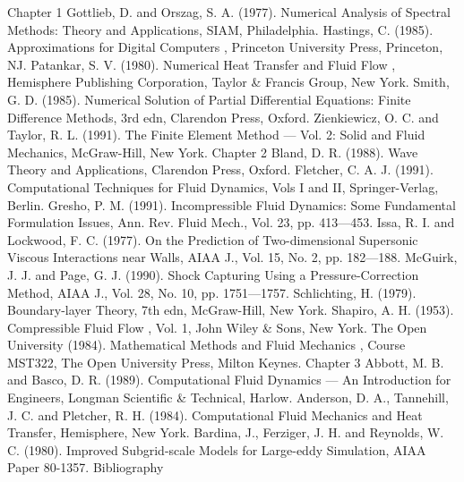 \documentclass[11pt,a4paper,openany,fontset=none]{ctexbook}
\begin{document}
\begin{sloppypar}

{\small Chapter 1 Gottlieb, D. and Orszag, S. A. (1977). Numerical Analysis of Spectral Methods: Theory and Applications, SIAM, Philadelphia. Hastings, C. (1985). Approximations for Digital Computers , Princeton University Press, Princeton, NJ. Patankar, S. V. (1980). Numerical Heat Transfer and Fluid Flow , Hemisphere Publishing Corporation, Taylor \& Francis Group, New York. Smith, G. D. (1985). Numerical Solution of Partial Differential Equations: Finite Difference Methods, 3rd edn, Clarendon Press, Oxford. Zienkiewicz, O. C. and Taylor, R. L. (1991). The Finite Element Method — Vol. 2: Solid and Fluid Mechanics, McGraw-Hill, New York. Chapter 2 Bland, D. R. (1988). Wave Theory and Applications, Clarendon Press, Oxford. Fletcher, C. A. J. (1991). Computational Techniques for Fluid Dynamics, Vols I and II, Springer-Verlag, Berlin. Gresho, P. M. (1991). Incompressible Fluid Dynamics: Some Fundamental Formulation Issues, Ann. Rev. Fluid Mech., Vol. 23, pp. 413—453. Issa, R. I. and Lockwood, F. C. (1977). On the Prediction of Two-dimensional Supersonic Viscous Interactions near Walls, AIAA J., Vol. 15, No. 2, pp. 182—188. McGuirk, J. J. and Page, G. J. (1990). Shock Capturing Using a Pressure-Correction Method, AIAA J., Vol. 28, No. 10, pp. 1751—1757. Schlichting, H. (1979). Boundary-layer Theory, 7th edn, McGraw-Hill, New York. Shapiro, A. H. (1953). Compressible Fluid Flow , Vol. 1, John Wiley \& Sons, New York. The Open University (1984). Mathematical Methods and Fluid Mechanics , Course MST322, The Open University Press, Milton Keynes. Chapter 3 Abbott, M. B. and Basco, D. R. (1989). Computational Fluid Dynamics — An Introduction for Engineers, Longman Scientific \& Technical, Harlow. Anderson, D. A., Tannehill, J. C. and Pletcher, R. H. (1984). Computational Fluid Mechanics and Heat Transfer, Hemisphere, New York. Bardina, J., Ferziger, J. H. and Reynolds, W. C. (1980). Improved Subgrid-scale Models for Large-eddy Simulation, AIAA Paper 80-1357. Bibliography}\par

\end{sloppypar}
\end{document}
